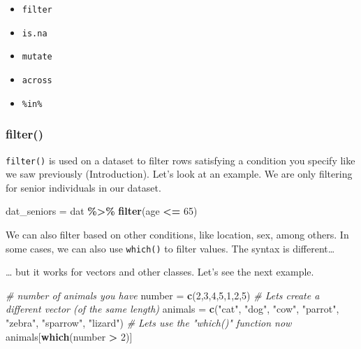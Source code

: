 \documentclass[
]{book}
\newenvironment{Shaded}{\begin{snugshade}}{\end{snugshade}}
\newcommand{\CommentTok}[1]{\textcolor[rgb]{0.56,0.35,0.01}{\textit{#1}}}
\newcommand{\DecValTok}[1]{\textcolor[rgb]{0.00,0.00,0.81}{#1}}
\newcommand{\FunctionTok}[1]{\textcolor[rgb]{0.13,0.29,0.53}{\textbf{#1}}}
\newcommand{\NormalTok}[1]{#1}
\newcommand{\OtherTok}[1]{\textcolor[rgb]{0.56,0.35,0.01}{#1}}
\newcommand{\SpecialCharTok}[1]{\textcolor[rgb]{0.81,0.36,0.00}{\textbf{#1}}}
\newcommand{\StringTok}[1]{\textcolor[rgb]{0.31,0.60,0.02}{#1}}
\providecommand{\tightlist}{%
  \setlength{\itemsep}{0pt}\setlength{\parskip}{0pt}}
\begin{document}
\begin{itemize}
\tightlist
\item
  \texttt{filter}
\item
  \texttt{is.na}
\item
  \texttt{mutate}
\item
  \texttt{across}
\item
  \texttt{\%in\%}
\end{itemize}

\hypertarget{filter}{%
\subsubsection{filter()}\label{filter}}

\texttt{filter()} is used on a dataset to filter rows satisfying a condition you specify like we saw previously (Introduction).
Let's look at an example. We are only filtering for senior individuals in our dataset.

\begin{Shaded}
\begin{Highlighting}[]
\NormalTok{dat\_seniors }\OtherTok{=}\NormalTok{ dat }\SpecialCharTok{\%\textgreater{}\%}
  \FunctionTok{filter}\NormalTok{(age }\SpecialCharTok{\textless{}=} \DecValTok{65}\NormalTok{)}
\end{Highlighting}
\end{Shaded}

We can also filter based on other conditions, like location, sex, among others.
In some cases, we can also use \texttt{which()} to filter values. The syntax is different\ldots{}

\begin{Shaded}
\end{Shaded}

\ldots{} but it works for vectors and other classes. Let's see the next example.

\begin{Shaded}
\begin{Highlighting}[]
\CommentTok{\# number of animals you have}
\NormalTok{number }\OtherTok{=} \FunctionTok{c}\NormalTok{(}\DecValTok{2}\NormalTok{,}\DecValTok{3}\NormalTok{,}\DecValTok{4}\NormalTok{,}\DecValTok{5}\NormalTok{,}\DecValTok{1}\NormalTok{,}\DecValTok{2}\NormalTok{,}\DecValTok{5}\NormalTok{)}
\CommentTok{\# Let\textquotesingle{}s create a different vector (of the same length)}
\NormalTok{animals }\OtherTok{=} \FunctionTok{c}\NormalTok{(}\StringTok{"cat"}\NormalTok{, }\StringTok{"dog"}\NormalTok{, }\StringTok{"cow"}\NormalTok{, }\StringTok{"parrot"}\NormalTok{, }\StringTok{"zebra"}\NormalTok{, }\StringTok{"sparrow"}\NormalTok{, }\StringTok{"lizard"}\NormalTok{)}
\CommentTok{\# Let\textquotesingle{}s use the "which()" function now}
\NormalTok{animals[}\FunctionTok{which}\NormalTok{(number }\SpecialCharTok{\textgreater{}} \DecValTok{2}\NormalTok{)]}
\end{Highlighting}
\end{Shaded}
\end{document}
